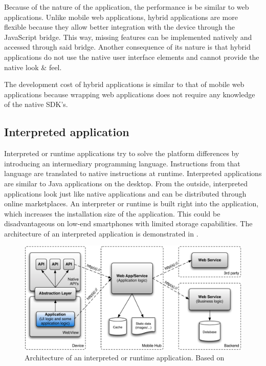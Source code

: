 Because of the nature of the application, the performance is be similar to web applications. Unlike mobile web applications, hybrid applications are more flexible because they allow better integration with the device through the JavaScript bridge. This way, missing features can be implemented natively and accessed through said bridge. Another consequence of its nature is that hybrid applications do not use the native user interface elements and cannot provide the native look \& feel. 

The development cost of hybrid applications is similar to that of mobile web applications because wrapping web applications does not require any knowledge of the native SDK's. 

\subsection{Interpreted application}

Interpreted or runtime applications try to solve the platform differences by introducing an intermediary programming language. Instructions from that language are translated to native instructions at runtime. Interpreted applications are similar to Java applications on the desktop. From the outside, interpreted applications look just like native applications and can be distributed through online marketplaces. An interpreter or runtime is built right into the application, which increases the installation size of the application. This could be disadvantageous on low-end smartphones with limited storage capabilities. The architecture of an interpreted application is demonstrated in .

\begin{figure}[h]
    \begin{center}
        \includegraphics[width=\textwidth]{figs/interpreted.pdf}
        \caption{Architecture of an interpreted or runtime application. Based on \cite{Friese}}
        \label{fig:interpreted}
    \end{center}
\end{figure}

